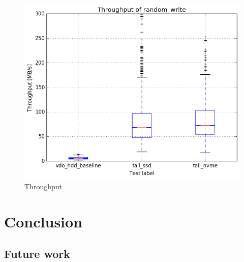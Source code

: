 \documentclass[
  color, %
  table, %
  lof,   %
  lot,   %
]{fithesis3}
\begin{document}
\begin{figure}[!htb]
        \centering
        \includegraphics[width=\textwidth]{../results/journal/report/random_write945_compare_boxplots}
\caption[Journal]{Throughput}
\label{fig:journal-all}
\end{figure}





\chapter{Conclusion}
\label{conclusion}

\section{Future work}
\end{document}
